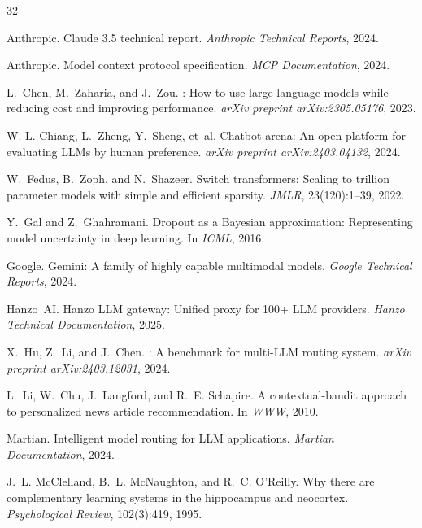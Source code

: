 
\begin{thebibliography}{32}

Anthropic.
\newblock Claude 3.5 technical report.
\newblock \emph{Anthropic Technical Reports}, 2024.

Anthropic.
\newblock Model context protocol specification.
\newblock \emph{MCP Documentation}, 2024.

L.~Chen, M.~Zaharia, and J.~Zou.
: How to use large language models while reducing cost and improving performance.
\newblock \emph{arXiv preprint arXiv:2305.05176}, 2023.

W.-L. Chiang, L.~Zheng, Y.~Sheng, et~al.
\newblock Chatbot arena: An open platform for evaluating {LLM}s by human preference.
\newblock \emph{arXiv preprint arXiv:2403.04132}, 2024.

W.~Fedus, B.~Zoph, and N.~Shazeer.
\newblock Switch transformers: Scaling to trillion parameter models with simple and efficient sparsity.
\newblock \emph{JMLR}, 23(120):1--39, 2022.

Y.~Gal and Z.~Ghahramani.
\newblock Dropout as a {Bayesian} approximation: Representing model uncertainty in deep learning.
\newblock In \emph{ICML}, 2016.

Google.
\newblock Gemini: A family of highly capable multimodal models.
\newblock \emph{Google Technical Reports}, 2024.

Hanzo~AI.
\newblock Hanzo {LLM} gateway: Unified proxy for 100+ {LLM} providers.
\newblock \emph{Hanzo Technical Documentation}, 2025.

X.~Hu, Z.~Li, and J.~Chen.
: A benchmark for multi-{LLM} routing system.
\newblock \emph{arXiv preprint arXiv:2403.12031}, 2024.

L.~Li, W.~Chu, J.~Langford, and R.~E. Schapire.
\newblock A contextual-bandit approach to personalized news article recommendation.
\newblock In \emph{WWW}, 2010.

Martian.
\newblock Intelligent model routing for {LLM} applications.
\newblock \emph{Martian Documentation}, 2024.

J.~L. McClelland, B.~L. McNaughton, and R.~C. O'Reilly.
\newblock Why there are complementary learning systems in the hippocampus and neocortex.
\newblock \emph{Psychological Review}, 102(3):419, 1995.


\end{thebibliography}
